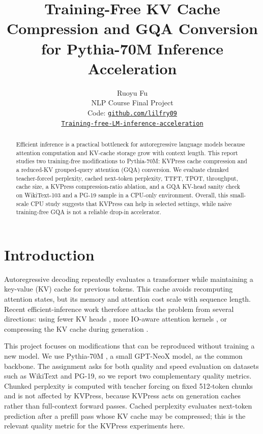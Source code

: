 \documentclass{article}
\title{Training-Free KV Cache Compression and GQA Conversion for Pythia-70M Inference Acceleration}
\author{%
  Ruoyu Fu \\
  NLP Course Final Project \\
  Code: \href{https://github.com/lilfry09/Training-free-LM-inference-acceleration}{\texttt{github.com/lilfry09}} \\
  \href{https://github.com/lilfry09/Training-free-LM-inference-acceleration}{\texttt{Training-free-LM-inference-acceleration}}
}
\begin{document}
\hypersetup{hidelinks}

\maketitle

\begin{abstract}
Efficient inference is a practical bottleneck for autoregressive language models because attention computation and KV-cache storage grow with context length. This report studies two training-free modifications to Pythia-70M: KVPress cache compression and a reduced-KV grouped-query attention (GQA) conversion. We evaluate chunked teacher-forced perplexity, cached next-token perplexity, TTFT, TPOT, throughput, cache size, a KVPress compression-ratio ablation, and a GQA KV-head sanity check on WikiText-103 and a PG-19 sample in a CPU-only environment. Overall, this small-scale CPU study suggests that KVPress can help in selected settings, while naive training-free GQA is not a reliable drop-in accelerator.
\end{abstract}

\section{Introduction}

Autoregressive decoding repeatedly evaluates a transformer while maintaining a key-value (KV) cache for previous tokens. This cache avoids recomputing attention states, but its memory and attention cost scale with sequence length. Recent efficient-inference work therefore attacks the problem from several directions: using fewer KV heads \citep{ainslie2023gqa}, more IO-aware attention kernels \citep{dao2022flashattention}, or compressing the KV cache during generation \citep{xiao2023streamingllm,kvpress2024}.

This project focuses on modifications that can be reproduced without training a new model. We use Pythia-70M \citep{biderman2023pythia}, a small GPT-NeoX model, as the common backbone. The assignment asks for both quality and speed evaluation on datasets such as WikiText and PG-19, so we report two complementary quality metrics. Chunked perplexity is computed with teacher forcing on fixed 512-token chunks and is not affected by KVPress, because KVPress acts on generation caches rather than full-context forward passes. Cached perplexity evaluates next-token prediction after a prefill pass whose KV cache may be compressed; this is the relevant quality metric for the KVPress experiments here.
\end{document}
